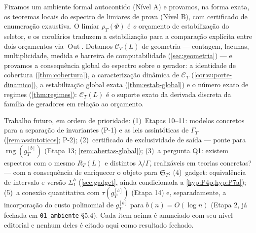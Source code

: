 \documentclass[11pt,a4paper]{article}
\theoremstyle{definition}
\theoremstyle{remark}
\newcommand{\Out}{\operatorname{Out}}
\begin{document}
Fixamos um ambiente formal autocontido (Nível A) e provamos, na forma exata, os
teoremas locais do espectro de limiares de prova (Nível B), com certificado de
enumeração exaustiva. O limiar $\rho_T(\Phi)$ é \emph{o} orçamento de
estabilização do seletor, e os corolários traduzem a estabilização para a
comparação explícita entre dois orçamentos via $\Out$. Dotamos
$\mathcal{C}_T(L)$ de geometria --- contagem, lacunas, multiplicidade, medida
e barreira de computabilidade (\cref{sec:geometria}) --- e provamos a
consequência global do espectro sobre o gerador: a identidade de cobertura
(\cref{thm:cobertura}), a caracterização dinâmica de $\mathcal{C}_T$
(\cref{cor:suporte-dinamico}), a estabilização global exata
(\cref{thm:estab-global}) e o número exato de regimes (\cref{thm:regimes}):
$\mathcal{C}_T(L)$ é o suporte exato da derivada discreta da família de
geradores em relação ao orçamento.

Trabalho futuro, em ordem de prioridade: (1)~Etapas 10--11: modelos
concretos para a separação de invariantes (P-1) e as leis assintóticas de
$\Gamma_T$ (\cref{rem:assintoticos}; P-2); (2)~certificado de exclusividade
de saída --- ponte para $\operatorname{rng}(g_T^{[b]})$ (Etapa 13;
\cref{rem:abertas-global}); (3)~a pergunta Q1: existem espectros com o mesmo
$R_T(L)$ e distintos $\lambda/\Gamma$, realizáveis em teorias concretas? ---
com a consequência de enriquecer o objeto para
$\mathfrak{S}_T$; (4)~gadget: equivalência de intervalo e versão
$\Sigma^b_1$ (\cref{sec:gadget}, ainda condicionada a
\cref{hyp:P4p,hyp:P7a}); (5)~a conexão quantitativa com
$\tau(g_T^{[b]})$ (Etapa 14) e, separadamente, a incorporação do custo
polinomial de $g_T^{[b]}$ para $b(n) = O(\log n)$ (Etapa 2, já fechada em
\texttt{01\_ambiente} §5.4). Cada item acima é anunciado com seu nível
editorial e nenhum deles é citado aqui como resultado fechado.



\end{document}
